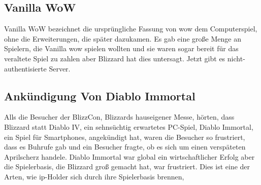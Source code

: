 \documentclass[fontsize=11, a4aper]{scrartcl}
\begin{document}

\subsection{Vanilla WoW} \label{subsec:Anlagen:Fallstudien_Ignorierter_Community_-_Bewegungen:Vanilla_WOW}

Vanilla WoW bezeichnet die ursprüngliche Fassung von \ac{wow} dem Computerspiel, ohne die Erweiterungen, die später dazukamen. Es gab eine große Menge an Spielern, die Vanilla \ac{wow} spielen wollten und sie waren sogar bereit für das veraltete Spiel zu zahlen aber Blizzard hat dies untersagt. Jetzt gibt es nicht-authentisierte Server.

\subsection{Ankündigung Von Diablo Immortal} \label{subsec:Anlagen:Fallstudien_Ignorierter_Community_-_Bewegungen:Ankündigung_von_Diablo_Immortal}

Alls die Besucher der BlizzCon, Blizzards hauseigener Messe, hörten, dass Blizzard statt \glqq Diablo IV\grqq, ein sehnsüchtig erwartetes PC-Spiel, \glqq Diablo Immortal\grqq, ein Spiel für Smartphones, angekündigt hat, waren die Besucher so frustriert, dass es Buhrufe gab und ein Besucher fragte, ob es sich um einen verspäteten Aprilscherz handele. Diablo Immortal war global ein wirtschaftlicher Erfolg aber die Spielerbasis, die Blizzard groß gemacht hat, war frustriert. Dies ist eine der Arten, wie \ac{ip}-Holder sich durch ihre Spielerbasis brennen,



\end{document}
